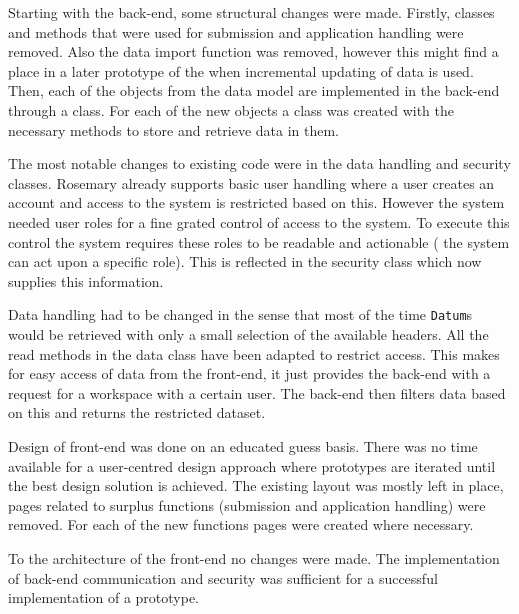 Starting with the back-end, some structural changes were made.
Firstly, classes and methods that were used for submission and application handling were removed.
Also the data import function was removed, however this might find a place in a later prototype of the \ivfsystem{} when incremental updating of data is used.
Then, each of the objects from the data model are implemented in the back-end through a class.
For each of the new objects a class was created with the necessary methods to store and retrieve data in them.

The most notable changes to existing code were in the data handling and security classes.
Rosemary already supports basic user handling where a user creates an account and access to the system is restricted based on this.
However the system needed user roles for a fine grated control of access to the system.
To execute this control the system requires these roles to be readable and actionable (\ie{} the system can act upon a specific role).
This is reflected in the security class which now supplies this information.

Data handling had to be changed in the sense that most of the time {\tt Datum}s would be retrieved with only a small selection of the available headers.
All the read methods in the data class have been adapted to restrict access.
This makes for easy access of data from the front-end, it just provides the back-end with a request for a workspace with a certain user.
The back-end then filters data based on this and returns the restricted dataset.

Design of front-end was done on an educated guess basis.
There was no time available for a user-centred design approach where prototypes are iterated until the best design solution is achieved.
The existing layout was mostly left in place, pages related to surplus functions (submission and application handling) were removed.
For each of the new functions pages were created where necessary.

To the architecture of the front-end no changes were made.
The implementation of back-end communication and security was sufficient for a successful implementation of a prototype.




